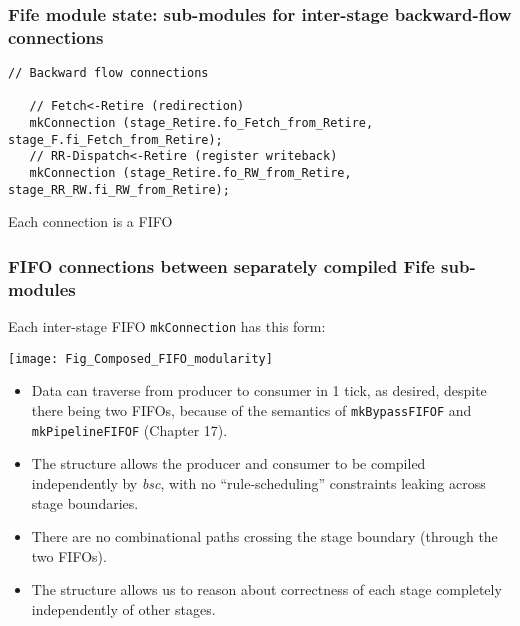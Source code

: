 
\begin{frame}[fragile]
\frametitle{Fife module state: sub-modules for inter-stage backward-flow connections}

\footnotesize

\begin{minipage}{0.75\textwidth}\scriptsize
\begin{Verbatim}[frame=single, label=From src\_Fife/CPU.bsv]
   // Backward flow connections

   // Fetch<-Retire (redirection)
   mkConnection (stage_Retire.fo_Fetch_from_Retire, stage_F.fi_Fetch_from_Retire);
   // RR-Dispatch<-Retire (register writeback)
   mkConnection (stage_Retire.fo_RW_from_Retire, stage_RR_RW.fi_RW_from_Retire);
\end{Verbatim}
\end{minipage}
\hm
\begin{minipage}{0.22\textwidth}
Each connection is a FIFO
\end{minipage}

\end{frame}


\begin{frame}[fragile]
\frametitle{FIFO connections between separately compiled Fife sub-modules}

\footnotesize

\begin{minipage}{0.22\textwidth}
Each inter-stage FIFO {\tt mkConnection} has this form:
\end{minipage}
\hfill
\begin{minipage}{0.75\textwidth}
\texttt{[image: Fig\_Composed\_FIFO\_modularity]}
\end{minipage}

\PAUSE{\vspace{2ex}}

\begin{itemize}

 \item Data can traverse from producer to consumer in 1 tick, as
       desired, despite there being two FIFOs, because of the
       semantics of {\tt mkBypassFIFOF} and {\tt mkPipelineFIFOF}
       (Chapter 17).

 \item The structure allows the producer and consumer to be compiled
       independently by \emph{bsc}, with no ``rule-scheduling''
       constraints leaking across stage boundaries.

 \item There are no combinational paths crossing the stage boundary
       (through the two FIFOs).

 \item The structure allows us to reason about correctness of each
       stage completely independently of other stages.

\end{itemize}

\end{frame}

